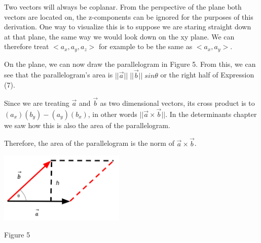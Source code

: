 \documentclass{article}
\begin{document}
\par\noindent Two vectors will always be coplanar. From the perspective of the plane both vectors are located on, the z-components can be ignored for the purposes of this derivation. One way to visualize this is to suppose we are staring straight down at that plane, the same way we would look down on the xy plane. We can therefore treat \(<a_x, a_y, a_z >\) for example to be the same as \(<a_x, a_y>\).
\newline
\newline
\begin{minipage}{.6\linewidth}
	\par\noindent On the plane, we can now draw the parallelogram in Figure 5. From this, we can see that the parallelogram's area is \( || \vec a || \; || \vec b || \; sin\theta \) or the right half of Expression (7).
	\newline
	\par\noindent Since we are treating \(\vec a\) and \(\vec b\) as two dimensional vectors, its cross product is to \((a_x)(b_y) - (a_y)(b_x)\), in other words \(|| \vec a \times \vec b ||\). In the determinants chapter we saw how this is also the area of the parallelogram. 
	\newline
	\par\noindent Therefore, the area of the parallelogram is the norm of \(\vec a \times \vec b\).
\end{minipage}
\begin{minipage}[c]{.4\linewidth}
	\begin{center}
			\includegraphics[width=6cm]{cross-sine.png}	
			\end{center}					\begin{center}
				Figure 5	
			\end{center}
\end{minipage}
\newpage
\end{document}
